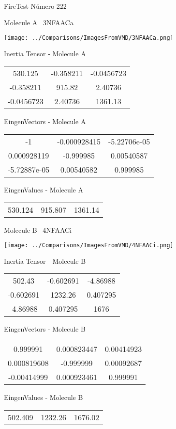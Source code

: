 \vtab[-3cm]
\begin{center}
{\large FireTest \tab Número 222}
\end{center}
\begin{multicols}{2}
\begin{center}

Molecule A \
3NFAACa

\texttt{[image: ../Comparisons/ImagesFromVMD/3NFAACa.png]}

Inertia Tensor - Molecule A \\
\begin{tabular}{|c c c|}
530.125	 & 	-0.358211	 & 	-0.0456723	 \\
-0.358211	 & 	915.82	 & 	2.40736	 \\
-0.0456723	 & 	2.40736	 & 	1361.13
\end{tabular}

\vtab
 EingenVectors - Molecule A     \\
\begin{tabular}{|c c c|}
-1	 & 	-0.000928415	 & 	-5.22706e-05	 \\
0.000928119	 & 	-0.999985	 & 	0.00540587	 \\
-5.72887e-05	 & 	0.00540582	 & 	0.999985
\end{tabular}

\vtab
 EingenValues - Molecule A     \\
\begin{tabular}{|c c c|}
530.124	 & 	915.807	 & 	1361.14	 \\
\end{tabular}
\columnbreak

Molecule B \
4NFAACi

\texttt{[image: ../Comparisons/ImagesFromVMD/4NFAACi.png]}

Inertia Tensor - Molecule B \\
\begin{tabular}{|c c c|}
502.43	 & 	-0.602691	 & 	-4.86988	 \\
-0.602691	 & 	1232.26	 & 	0.407295	 \\
-4.86988	 & 	0.407295	 & 	1676
\end{tabular}

\vtab
 EingenVectors - Molecule B     \\
\begin{tabular}{|c c c|}
0.999991	 & 	0.000823447	 & 	0.00414923	 \\
0.000819608	 & 	-0.999999	 & 	0.00092687	 \\
-0.00414999	 & 	0.000923461	 & 	0.999991
\end{tabular}

\vtab
 EingenValues - Molecule B     \\
\begin{tabular}{|c c c|}
502.409	 & 	1232.26	 & 	1676.02	 \\
\end{tabular}

\end{center}
\end{multicols}


